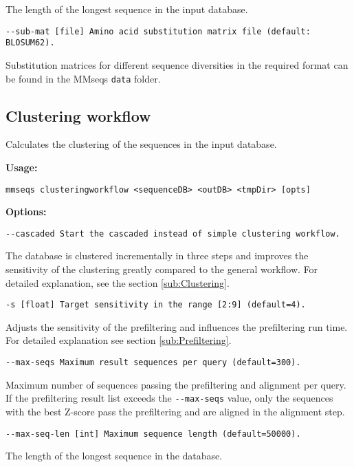 \documentclass[11pt,a4paper]{report}
\begin{document}
The length of the longest sequence in the input database.

\texttt{\small -{}-sub-mat {[}file{]} Amino acid substitution matrix
file (default: BLOSUM62).}{\small \par}

Substitution matrices for different sequence diversities in the required
format can be found in the MMseqs \texttt{data} folder.


\subsection{Clustering workflow\label{sub:Clustering-workflow}}

Calculates the clustering of the sequences in the input database. 

\textbf{Usage:}

\texttt{mmseqs clusteringworkflow <sequenceDB> <outDB> <tmpDir> {[}opts{]}}

\textbf{Options:}

\texttt{\small -{}-cascaded Start the cascaded instead of simple clustering
workflow.}{\small \par}

The database is clustered incrementally in three steps and improves
the sensitivity of the clustering greatly compared to the general
workflow. For detailed explanation, see the section \ref{sub:Clustering}.

\texttt{\small -s {[}float{]} Target sensitivity in the range {[}2:9{]}
(default=4).}{\small \par}

Adjusts the sensitivity of the prefiltering and influences the prefiltering
run time. For detailed explanation see section \ref{sub:Prefiltering}.

\texttt{\small -{}-max-seqs Maximum result sequences per query (default=300).}{\small \par}

Maximum number of sequences passing the prefiltering and alignment
per query. If the prefiltering result list exceeds the \texttt{-{}-max-seqs}
value, only the sequences with the best Z-score pass the prefiltering
and are aligned in the alignment step.

\texttt{\small -{}-max-seq-len {[}int{]} Maximum sequence length (default=50000).}{\small \par}

The length of the longest sequence in the database.
\end{document}
